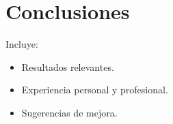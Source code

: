 \section{Conclusiones}
Incluye:
\begin{itemize}
\item Resultados relevantes.
\item Experiencia personal y profesional.
\item Sugerencias de mejora.
\end{itemize}